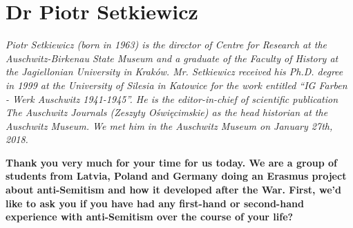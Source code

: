 \section{Dr Piotr Setkiewicz}

\textit{Piotr Setkiewicz (born in 1963) is the director of Centre for Research at the Auschwitz-Birkenau State Museum and a graduate of the Faculty of History at the Jagiellonian University in Kraków. Mr. Setkiewicz received his Ph.D. degree in 1999 at the University of Silesia in Katowice for the work entitled ``IG Farben - Werk Auschwitz 1941-1945''. He is the editor-in-chief of scientific publication The Auschwitz Journals (Zeszyty Oświęcimskie) as the head historian at the Auschwitz Museum. We met him in the Auschwitz Museum on January 27th, 2018.}\par 
\vspace*{2em}
\textbf{Thank you very much for your time for us today. We are a group of students from Latvia, Poland and Germany doing an Erasmus project about anti-Semitism and how it developed after the War. First, we'd like to ask you if you have had any first-hand or second-hand experience with anti-Semitism over the course of your life?}

